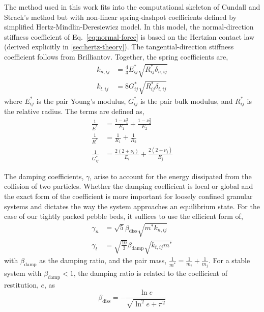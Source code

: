 The method used in this work fits into the computational skeleton of Cundall and Strack's method but with non-linear spring-dashpot coefficients defined by simplified Hertz-Mindlin-Deresiewicz model. In this model, the normal-direction stiffness coefficient of Eq.~\ref{eq:normal-force} is based on the Hertzian contact law (derived explicitly in \cref{sec:hertz-theory}). The tangential-direction stiffness coefficient follows from Brilliantov.\cite{Brilliantov1996, Zhu2007, Langston1995} Together, the spring coefficients are,
\begin{subequations}
\begin{align}
	k_{n,ij} &= \frac{4}{3}E_{ij}^*\sqrt{R_{ij}^*\delta_{n,ij}} \\
	k_{t,ij} &= 8 G_{ij}^*\sqrt{R_{ij}^*\delta_{t,ij}}
\end{align}
\end{subequations}
where $E_{ij}^*$ is the pair Young's modulus, $G_{ij}^*$ is the pair bulk modulus, and $R_{ij}^*$ is the relative radius. The terms are defined as,
\begin{subequations}
\begin{align}
	\frac{1}{E^*} &= \frac{1-\nu_1^2}{E_1} + \frac{1-\nu_2^2}{E_2} \\
	\frac{1}{R^*} &= \frac{1}{R_1} + \frac{1}{R_2} \\
	\frac{1}{G^*_{ij}} &= \frac{2(2+\nu_i)}{E_i} + \frac{2(2+\nu_j)}{E_j}
\end{align}
\end{subequations}

The damping coefficients, $\gamma$, arise to account for the energy dissipated from the collision of two particles\cite{DiRenzo2004, Tsuji1992, Tsuji1993}. Whether the damping coefficient is local or global and the exact form of the coefficient is more important for loosely confined granular systems and dictates the way the system approaches an equilibrium state\cite{Makse2004}. For the case of our tightly packed pebble beds, it suffices to use the efficient form of\cite{Dippel1996, Makse2004, Brilliantov1996, Zhang2005, Zhu2007},
\begin{subequations}
\begin{align}
	\gamma_n &= \sqrt{5}\beta_\text{diss}\sqrt{m^*k_{n,ij}} \\
	\gamma_t &= \sqrt{\frac{10}{3}}\beta_\text{damp}\sqrt{k_{t,ij} m^*}
\end{align}
\end{subequations}
with $\beta_\text{damp}$ as the damping ratio, and the pair mass, $\frac{1}{m^*} = \frac{1}{m_i} + \frac{1}{m_j}$. For a stable system with $\beta_\text{damp} < 1$, the damping ratio is related to the coefficient of restitution, $e$, as
\begin{equation}
	\beta_\text{diss} = -\frac{\ln{e}}{\sqrt{\ln^2{e}+\pi^2}}
\end{equation}

